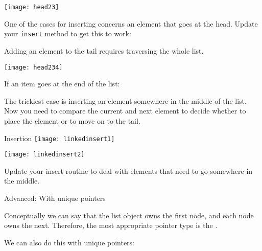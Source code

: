 \par

\texttt{[image: head23]}

\begin{exercise}
  \label{ex:linklist-insert-head}
  One of the cases for inserting concerns an element that goes at the
  head. Update your \lstinline{insert} method to get this to work:
\end{exercise}

\par

Adding an element to the tail requires traversing the whole list.

\texttt{[image: head234]}

\begin{exercise}
  \label{ex:linklist-insert-tail}
  If an item goes at the end of the list:
\end{exercise}

\par

The trickiest case is inserting an element somewhere in the middle of the list.
Now you need to compare the current and next element to decide whether to
place the element or to move on to the tail.

\begin{block}{Insertion}
  \label{sl:linklist-insert-middle}
  \texttt{[image: linkedinsert1]}

  \texttt{[image: linkedinsert2]}
\end{block}


\begin{exercise}
  \label{ex:linklist-insert-middle}
  Update your insert routine to deal with elements
  that need to go somewhere in the middle.
  
\end{exercise}


 {Advanced: With unique pointers}

Conceptually we can say
that the list object owns the first node, and each node owns the
next.
Therefore, the most appropriate pointer type is  the .

We can also do this with unique pointers:

